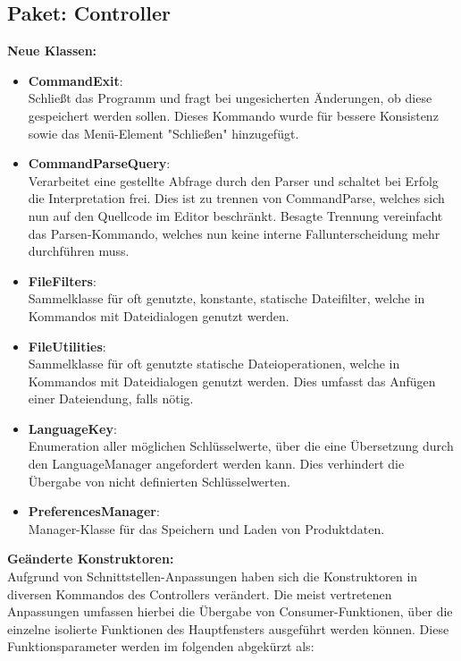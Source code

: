 \documentclass[parskip=full,11pt,twoside]{scrartcl}
\begin{document}
\subsection{Paket: Controller}
\textbf{Neue Klassen:}\\
\begin{itemize}
	\item \textbf{CommandExit}:\\
	Schließt das Programm und fragt bei ungesicherten Änderungen, ob diese gespeichert werden sollen. Dieses Kommando wurde für bessere Konsistenz sowie das Menü-Element "Schließen" hinzugefügt.
	\item \textbf{CommandParseQuery}:\\
	Verarbeitet eine gestellte Abfrage durch den Parser und schaltet bei Erfolg die Interpretation frei. Dies ist zu trennen von CommandParse, welches sich nun auf den Quellcode im Editor beschränkt. Besagte Trennung vereinfacht das Parsen-Kommando, welches nun keine interne Fallunterscheidung mehr durchführen muss.
	\item \textbf{FileFilters}:\\
	Sammelklasse für oft genutzte, konstante, statische Dateifilter, welche in Kommandos mit Dateidialogen genutzt werden.
	\item \textbf{FileUtilities}:\\
	Sammelklasse für oft genutzte statische Dateioperationen, welche in Kommandos mit Dateidialogen genutzt werden. Dies umfasst das Anfügen einer Dateiendung, falls nötig.
	\item \textbf{LanguageKey}:\\
	Enumeration aller möglichen Schlüsselwerte, über die eine Übersetzung durch den LanguageManager angefordert werden kann. Dies verhindert die Übergabe von nicht definierten Schlüsselwerten.
	\item \textbf{PreferencesManager}:\\
	Manager-Klasse für das Speichern und Laden von Produktdaten.
\end{itemize}

\textbf{Geänderte Konstruktoren:}\\
Aufgrund von Schnittstellen-Anpassungen haben sich die Konstruktoren in diversen Kommandos des Controllers verändert. Die meist vertretenen Anpassungen umfassen hierbei die Übergabe von Consumer-Funktionen, über die einzelne isolierte Funktionen des Hauptfensters ausgeführt werden können. Diese Funktionsparameter werden im folgenden abgekürzt als:
\end{document}

